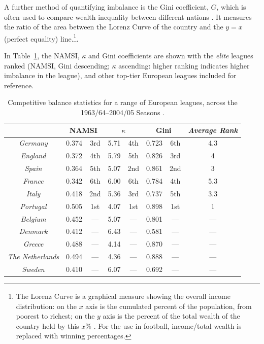 \documentclass[a4paper,10pt]{report}
\begin{document}
A further method of quantifying imbalance is the Gini coefficient, $G$, which is often used to compare wealth inequality between different nations \autocite{GiniWorldCoeffs18}. It measures the ratio of the area between the Lorenz Curve of the country and the $y=x$ (perfect equality) line.\footnote{The Lorenz Curve is a graphical measure showing the overall income distribution: on the $x$ axis is the cumulated percent of the population, from poorest to richest; on the $y$ axis is the percent of the total wealth of the country held by this $x\%$ \autocite{Lorenz05}. For the use in football, income/total wealth is replaced with winning percentages.}.\vspace{3mm}

In Table~\ref{tab:compbalcoeffs}, the NAMSI, $\kappa$ and Gini coefficients are shown \autocite{Goossens05} with the \textit{elite} leagues ranked (NAMSI, Gini descending; $\kappa$ ascending: higher ranking indicates higher imbalance in the league), and other top-tier European leagues included for reference. \vspace{3mm}

\begin{table}[h!]\begin{center}\begin{tabular}{c||cc|cc|cc || c}
	&\multicolumn{2}{c|}{NAMSI} & \multicolumn{2}{c|}{$\kappa$} &\multicolumn{2}{c||}{Gini} & \textit{Average Rank} \\\hline\hline
	\emph{Germany} & 0.374 & 3rd & 5.71 & 4th& 0.723 & 6th 	&4.3\\
	\emph{England} & 0.372 & 4th& 5.79&5th& 0.826 &3rd 		&4\\
	\emph{Spain} & 0.364&5th&  5.07  &2nd&0.861 &2nd		&3\\
	\emph{France} & 0.342 &6th& 6.00 &6th& 0.784 &4th 		&5.3\\
	\emph{Italy} & 0.418 &2nd& 5.36 &3rd& 0.737 &5th 		&3.3\\
	\emph{Portugal}& 0.505 & 1st&4.07 & 1st&0.898 &1st  	&1\\\hline
	\emph{Belgium} & 0.452 & --- & 5.07 & --- & 0.801 & ---&---\\
	\emph{Denmark} & 0.412 & --- & 6.43 & --- & 0.581& --- &---\\
	\emph{Greece} & 0.488 &---& 4.14 &---& 0.870 & ---&---\\
	\emph{The Netherlands} & 0.494 & --- & 4.36 & --- & 0.888 & ---&---\\
	\emph{Sweden} & 0.410 & --- & 6.07 & --- & 0.692 & --- &---
	
	
\end{tabular}\end{center}\caption{Competitive balance statistics for a range of European leagues, across the 1963/64--2004/05 Seasons \autocite{Goossens05}.}\label{tab:compbalcoeffs}
\end{table} 
\end{document}
